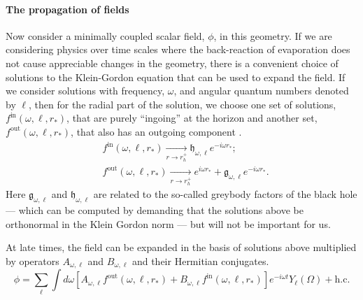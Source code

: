 \documentclass[12pt]{article}
\def\fout{f^{\text{out}}}
\def\fin{f^{\text{in}}}
\def\grey{\mathfrak{g}}
\def\white{\mathfrak{h}}
\def\rtor{{r_*}}
\newcommand{\be}{\begin{equation}}
\newcommand{\ee}{\end{equation}}
\begin{document}
\paragraph{\bf The propagation of fields \\}
Now consider a minimally coupled scalar field, $\phi$,  in this geometry.  If we are considering physics over time scales where the back-reaction of evaporation does not cause appreciable changes in the geometry,  there is a convenient choice of solutions to the Klein-Gordon equation that can be used to expand the field. If we consider solutions with frequency, $\omega$, and angular quantum numbers denoted by $\ell$, then for the radial part of the solution, we choose one set of solutions, $\fin(\omega, \ell, \rtor)$, that are purely ``ingoing'' at the horizon and another set, $\fout(\omega, \ell, \rtor)$, that also has an outgoing component \cite{Candelas:1980zt,dewitt1975quantum}.
\be
\label{foutfinexpansion}
\begin{split}
&\fin(\omega, \ell, \rtor) \underset{r \rightarrow r_h^+}{\longrightarrow} \white_{\omega, \ell} e^{-i \omega \rtor};\\
&\fout(\omega, \ell, \rtor)  \underset{r \rightarrow r_h^+}{\longrightarrow} e^{i \omega \rtor} + \grey_{\omega, \ell} e^{-i \omega \rtor}.
\end{split}
\ee
Here $\grey_{\omega, \ell}$ and $\white_{\omega, \ell}$ are related to the so-called greybody factors of the black hole --- which can be computed by demanding that the solutions above be orthonormal in the Klein Gordon norm --- but will not be important for us.

At late times, the field can be expanded in the basis of solutions above  multiplied by operators $A_{\omega, \ell}$ and $B_{\omega, \ell}$ and their Hermitian conjugates.
\be
\label{fieldoutside}
\phi = \sum_{\ell} \int d \omega \left[A_{\omega, \ell} \fout(\omega, \ell, \rtor)  + B_{\omega, \ell} \fin(\omega, \ell, \rtor)\right] e^{-i \omega t} Y_{\ell}(\Omega) + \text{h.c.}
\ee
\end{document}
